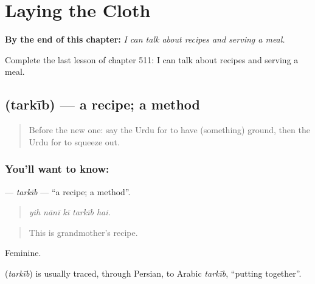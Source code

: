 
\chapter{Laying the Cloth}
\label{ch:ur-laying-the-cloth}

\begin{chapteropening}
\textbf{By the end of this chapter:} \emph{I can talk about recipes and serving a meal.}

Complete the last lesson of chapter 511: I can talk about recipes and serving a meal.
\end{chapteropening}

\section[\texorpdfstring{\ur{ترکیب} (tarkīb)}{ترکیب (tarkīb)}]{ (tarkīb) — a recipe; a method}

\label{lesson:UR-C511-tarkib}



\begin{quote}
Before the new one: say the Urdu for to have (something) ground, then the Urdu for to squeeze out.
\end{quote}

\subsection*{You'll want to know: }
\textbf{} — \emph{tarkīb} — \textquotedblleft{}a recipe; a method\textquotedblright{}.

\begin{quote}
    
\end{quote}

\begin{quote}
\emph{yih nānī kī tarkīb hai.}
\end{quote}

\begin{quote}
This is grandmother's recipe.
\end{quote}

Feminine.

\begin{cousinweb}
\textbf{} (\emph{tarkīb}) is usually traced, through Persian, to Arabic \emph{tarkīb}, \textquotedblleft{}putting together\textquotedblright{}.
\end{cousinweb}


